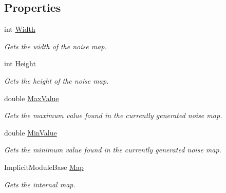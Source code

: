 \subsection*{Properties}
\begin{DoxyCompactItemize}
\item 
int \hyperlink{class_midnight_blue_1_1_noise_map_a09a672256f9fb4c529e8052e428c18d2}{Width}
\begin{DoxyCompactList}\small\item\em Gets the width of the noise map. \end{DoxyCompactList}\item 
int \hyperlink{class_midnight_blue_1_1_noise_map_abfffdfa7bb7a696e495bbfb2e6ac0c57}{Height}
\begin{DoxyCompactList}\small\item\em Gets the height of the noise map. \end{DoxyCompactList}\item 
double \hyperlink{class_midnight_blue_1_1_noise_map_ac7a1a8a255b1512b1d09751b68636a32}{Max\+Value}
\begin{DoxyCompactList}\small\item\em Gets the maximum value found in the currently generated noise map. \end{DoxyCompactList}\item 
double \hyperlink{class_midnight_blue_1_1_noise_map_a4b3978175deb42036e5a5e4f0ce5692e}{Min\+Value}
\begin{DoxyCompactList}\small\item\em Gets the minimum value found in the currently generated noise map. \end{DoxyCompactList}\item 
Implicit\+Module\+Base \hyperlink{class_midnight_blue_1_1_noise_map_a428d013274d19ed0775adc6d32f00719}{Map}
\begin{DoxyCompactList}\small\item\em Gets the internal map. \end{DoxyCompactList}\end{DoxyCompactItemize}


